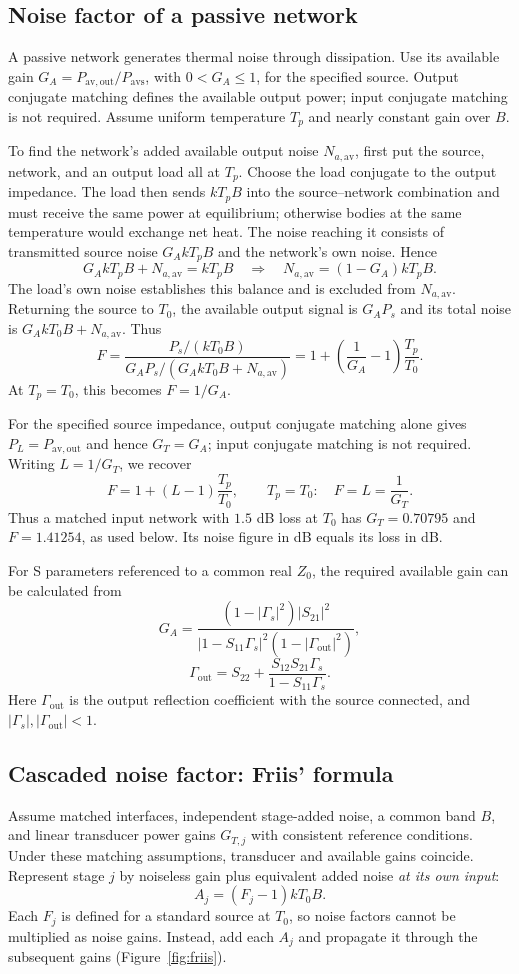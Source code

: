 \subsection{Noise factor of a passive network}
\label{sec:passive-noise}
A passive network generates thermal noise through dissipation. Use its available gain $G_A=P_{\mathrm{av,out}}/P_{\mathrm{avs}}$, with $0<G_A\leq1$, for the specified source. Output conjugate matching defines the available output power; input conjugate matching is not required. Assume uniform temperature $T_p$ and nearly constant gain over $B$.

To find the network's added available output noise $N_{a,\mathrm{av}}$, first put the source, network, and an output load all at $T_p$. Choose the load conjugate to the output impedance. The load then sends $kT_pB$ into the source--network combination and must receive the same power at equilibrium; otherwise bodies at the same temperature would exchange net heat. The noise reaching it consists of transmitted source noise $G_AkT_pB$ and the network's own noise. Hence
\[
G_AkT_pB+N_{a,\mathrm{av}}=kT_pB
\quad\Longrightarrow\quad
N_{a,\mathrm{av}}=(1-G_A)kT_pB.
\]
The load's own noise establishes this balance and is excluded from $N_{a,\mathrm{av}}$. Returning the source to $T_0$, the available output signal is $G_AP_s$ and its total noise is $G_AkT_0B+N_{a,\mathrm{av}}$. Thus
\[
F=\frac{P_s/(kT_0B)}
{G_AP_s/(G_AkT_0B+N_{a,\mathrm{av}})}
=\boxed{1+\left(\frac1{G_A}-1\right)\frac{T_p}{T_0}.}
\]
At $T_p=T_0$, this becomes $F=1/G_A$.

For the specified source impedance, output conjugate matching alone gives $P_L=P_{\mathrm{av,out}}$ and hence $G_T=G_A$; input conjugate matching is not required. Writing $L=1/G_T$, we recover
\[
F=1+(L-1)\frac{T_p}{T_0},
\qquad
\boxed{T_p=T_0:\quad F=L=\frac1{G_T}.}
\]
Thus a matched input network with $1.5$ dB loss at $T_0$ has $G_T=0.70795$ and $F=1.41254$, as used below. Its noise figure in dB equals its loss in dB.

For S parameters referenced to a common real $Z_0$, the required available gain can be calculated from
\[
G_A=\frac{(1-|\Gamma_s|^2)|S_{21}|^2}
{|1-S_{11}\Gamma_s|^2(1-|\Gamma_{\mathrm{out}}|^2)},
\]
\[
\Gamma_{\mathrm{out}}=S_{22}+\frac{S_{12}S_{21}\Gamma_s}{1-S_{11}\Gamma_s}.
\]
Here $\Gamma_{\mathrm{out}}$ is the output reflection coefficient with the source connected, and $|\Gamma_s|,|\Gamma_{\mathrm{out}}|<1$.

\subsection{Cascaded noise factor: Friis' formula}
Assume matched interfaces, independent stage-added noise, a common band $B$, and linear transducer power gains $G_{T,j}$ with consistent reference conditions. Under these matching assumptions, transducer and available gains coincide. Represent stage $j$ by noiseless gain plus equivalent added noise \emph{at its own input}:
\[
A_j=(F_j-1)kT_0B.
\]
Each $F_j$ is defined for a standard source at $T_0$, so noise factors cannot be multiplied as noise gains. Instead, add each $A_j$ and propagate it through the subsequent gains (Figure~\ref{fig:friis}).
\FriisFigure


